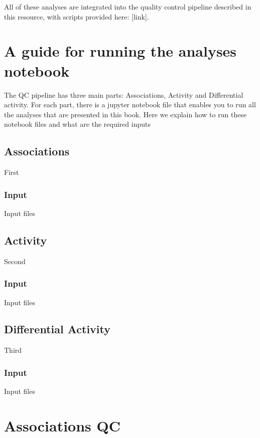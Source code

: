 \documentclass[
]{book}
\begin{document}
All of these analyses are integrated into the quality control pipeline described in this resource, with scripts provided here: {[}link{]}.

\chapter{A guide for running the analyses notebook}\label{a-guide-for-running-the-analyses-notebook}

The QC pipeline has three main parts: Associations, Activity and Differential activity.
For each part, there is a jupyter notebook file that enables you to run all the analyses that are presented in this book.
Here we explain how to run these notebook files and what are the required inputs

\section{Associations}\label{associations}

First

\subsection{Input}\label{input}

Input files

\section{Activity}\label{activity}

Second

\subsection{Input}\label{input-1}

Input files

\section{Differential Activity}\label{differential-activity}

Third

\subsection{Input}\label{input-2}

Input files

\chapter{Associations QC}\label{associations-qc}
\end{document}
